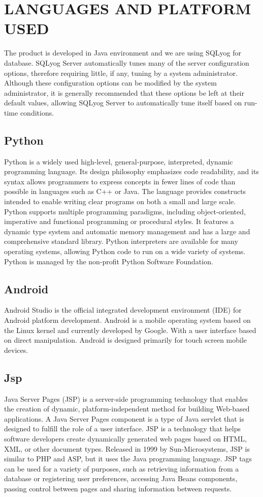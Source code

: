 \documentclass[12pt,a4paper,oneside]{report}
\begin{document}
{\section{LANGUAGES AND PLATFORM USED}
\par The product is developed in Java environment and we are using SQLyog for database. SQLyog Server automatically tunes many of the server configuration options, therefore requiring little, if any, tuning by a system administrator. Although these configuration options can be modified by the system administrator, it is generally recommended that these options be left at their default values, allowing SQLyog Server to automatically tune itself based on run-time conditions.

\subsection{Python}
\par Python is a widely used high-level, general-purpose, interpreted, dynamic programming language. Its design philosophy emphasizes code readability, and its syntax allows programmers to express concepts in fewer lines of code than possible in languages such as C++ or Java. The language provides constructs intended to enable writing clear programs on both a small and large scale. Python supports multiple programming paradigms, including object-oriented, imperative and functional programming or procedural styles. It features a dynamic type system and automatic memory management and has a large and comprehensive standard library. Python interpreters are available for many operating systems, allowing Python code to run on a wide variety of systems. Python is managed by the non-proﬁt Python Software Foundation.
\subsection{Android}
Android Studio is the official integrated development environment (IDE) for Android platform development. Android is a mobile operating system based on the Linux kernel and currently developed by Google. With a user interface based on direct manipulation. Android is designed primarily for touch screen mobile devices.\\
\subsection{Jsp}
\par Java Server Pages (JSP) is a server-side programming technology that enables the creation of dynamic, platform-independent method for building Web-based applications. A Java Server Pages component is a type of Java servlet that is designed to fulfill the role of a user interface.
JSP is a technology that helps software developers create dynamically generated web pages based on HTML, XML, or other document types. Released in 1999 by Sun-Microsystems, JSP is similar to PHP and ASP, but it uses the Java programming language. JSP tags can be used for a variety of purposes, such as retrieving information from a database or registering user preferences, accessing Java Beans components, passing control between pages and sharing information between requests.\\
}
\end{document}
